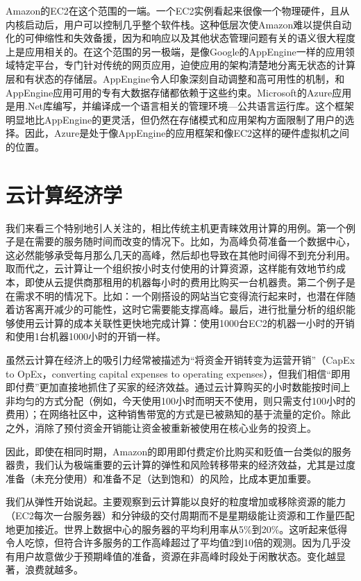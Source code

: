 Amazon的EC2在这个范围的一端。一个EC2实例看起来很像一个物理硬件，且从内核启动后，用户可以控制几乎整个软件栈。这种低层次使Amazon难以提供自动化的可伸缩性和失效备援，因为和响应以及其他状态管理问题有关的语义很大程度上是应用相关的。在这个范围的另一极端，是像Google的AppEngine一样的应用领域特定平台，专门针对传统的网页应用，迫使应用的架构清楚地分离无状态的计算层和有状态的存储层。AppEngine令人印象深刻自动调整和高可用性的机制，和AppEngine应用可用的专有大数据存储都依赖于这些约束。Microsoft的Azure应用是用.Net库编写，并编译成一个语言相关的管理环境—公共语言运行库。这个框架明显地比AppEngine的更灵活，但仍然在存储模式和应用架构方面限制了用户的选择。因此，Azure是处于像AppEngine的应用框架和像EC2这样的硬件虚拟机之间的位置。

\section{云计算经济学}

我们来看三个特别地引人关注的，相比传统主机更青睐效用计算的用例。第一个例子是在需要的服务随时间而改变的情况下。比如，为高峰负荷准备一个数据中心，这必然能够承受每月那么几天的高峰，然后却也导致在其他时间得不到充分利用。取而代之，云计算让一个组织按小时支付使用的计算资源，这样能有效地节约成本，即使从云提供商那租用的机器每小时的费用比购买一台机器贵。第二个例子是在需求不明的情况下。比如：一个刚搭设的网站当它变得流行起来时，也潜在伴随着访客离开减少的可能性，这时它需要能支撑高峰。最后，进行批量分析的组织能够使用云计算的成本关联性更快地完成计算：使用1000台EC2的机器一小时的开销和使用1台机器1000小时的开销一样。

虽然云计算在经济上的吸引力经常被描述为“将资金开销转变为运营开销”（CapEx to OpEx，converting capital expenses to operating expenses），但我们相信“即用即付费”更加直接地抓住了买家的经济效益。通过云计算购买的小时数能按时间上非均匀的方式分配（例如，今天使用100小时而明天不使用，则只需支付100小时的费用）；在网络社区中，这种销售带宽的方式是已被熟知的基于流量的定价。除此之外，消除了预付资金开销能让资金被重新被使用在核心业务的投资上。

因此，即使在相同时期，Amazon的即用即付费定价比购买和贬值一台类似的服务器贵，我们认为极端重要的云计算的弹性和风险转移带来的经济效益，尤其是过度准备（未充分使用）和准备不足（达到饱和）的风险，比成本更加重要。

我们从弹性开始说起。主要观察到云计算能以良好的粒度增加或移除资源的能力（EC2每次一台服务器）和分钟级的交付周期而不是星期级能让资源和工作量匹配地更加接近。世界上数据中心的服务器的平均利用率从5\%到20\%。这听起来低得令人吃惊，但符合许多服务的工作高峰超过了平均值2到10倍的观测。因为几乎没有用户故意做少于预期峰值的准备，资源在非高峰时段处于闲散状态。变化越显著，浪费就越多。

